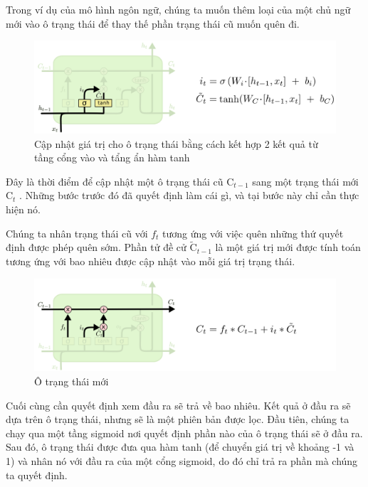  \indent Trong ví dụ của mô hình ngôn ngữ, chúng ta muốn thêm loại của một chủ ngữ mới vào ô trạng thái để thay thế phần trạng thái cũ muốn quên đi.

\begin{figure}[H]
    \centering
    \includegraphics[width=14cm]{Images/Architecture/LSTM3-focus-i.png}
\caption{ Cập nhật giá trị cho ô trạng thái bằng cách kết hợp 2 kết quả từ tầng cổng vào và tẩng ẩn hàm tanh}
\end{figure}

\indent Đây là thời điểm để cập nhật một ô trạng thái cũ \( \text{C}_{t-1} \)
 sang một trạng thái mới \( \text{C}_{t} \)
. Những bước trước đó đã quyết định làm cái gì, và tại bước này chỉ cần thực hiện nó.

\indent Chúng ta nhân trạng thái cũ với \( f_{t} \)
 tương ứng với việc quên những thứ quyết định được phép quên sớm. Phần tử đề cử \( \tilde{\text{C}}_{t-1} \)
 là một giá trị mới được tính toán tương ứng với bao nhiêu được cập nhật vào mỗi giá trị trạng thái.

 \begin{figure}[H]
    \centering
    \includegraphics[width=14cm]{Images/Architecture/LSTM3-focus-C.png}
\caption{Ô trạng thái mới}
\end{figure}

\indent Cuối cùng cần quyết định xem đầu ra sẽ trả về bao nhiêu. Kết quả ở đầu ra sẽ dựa trên ô trạng thái, nhưng sẽ là một phiên bản được lọc. Đầu tiên, chúng ta chạy qua một tầng sigmoid nơi quyết định phần nào của ô trạng thái sẽ ở đầu ra. Sau đó, ô trạng thái được đưa qua hàm tanh (để chuyển giá trị về khoảng -1 và 1) và nhân nó với đầu ra của một cổng sigmoid, do đó chỉ trả ra phần mà chúng ta quyết định.

